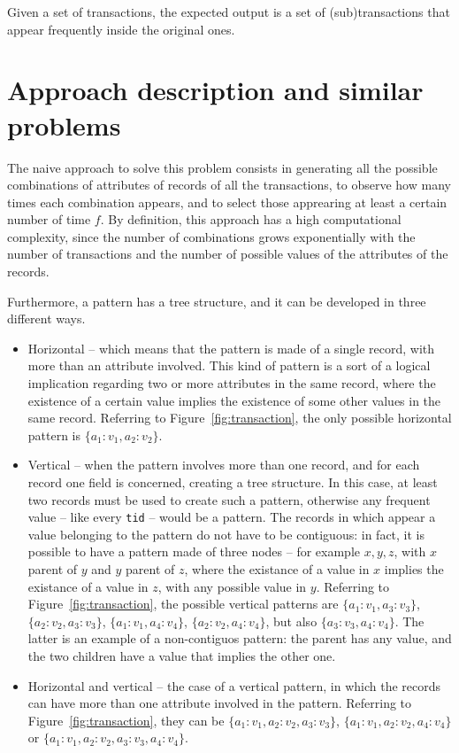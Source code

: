 \documentclass{acm_proc_article-sp-sigmod09}
\begin{document}
Given a set of transactions, the expected output is a set of (sub)transactions that appear frequently inside the original ones.

\section{Approach description and similar problems}
\label{sec:general}
The naive approach to solve this problem consists in generating all the possible combinations of attributes of records of all the transactions, to observe how many times each combination appears, and to select those apprearing at least a certain number of time $f$. By definition, this approach has a high computational complexity, since the number of combinations grows exponentially with the number of transactions and the number of possible values of the attributes of the records.

Furthermore, a pattern has a tree structure, and it can be developed in three different ways.
\begin{itemize}
\item Horizontal -- which means that the pattern is made of a single record, with more than an attribute involved. This kind of pattern is a sort of a logical implication regarding two or more attributes in the same record, where the existence of a certain value implies the existence of some other values in the same record. Referring to Figure~\ref{fig:transaction}, the only possible horizontal pattern is $\{a_1 \colon v_1, a_2 \colon v_2\}$.
\item Vertical -- when the pattern involves more than one record, and for each record one field is concerned, creating a tree structure. In this case, at least two records must be used to create such a pattern, otherwise any frequent value -- like every \texttt{tid} -- would be a pattern. The records in which appear a value belonging to the pattern do not have to be contiguous: in fact, it is possible to have a pattern made of three nodes -- for example $x, y, z$, with $x$ parent of $y$ and $y$ parent of $z$, where the existance of a value in $x$ implies the existance of a value in $z$, with any possible value in $y$. Referring to Figure~\ref{fig:transaction}, the possible vertical patterns are $\{a_1 \colon v_1, a_3 \colon v_3\}$, $\{a_2 \colon v_2, a_3 \colon v_3\}$, $\{a_1 \colon v_1, a_4 \colon v_4\}$, $\{a_2 \colon v_2, a_4 \colon v_4\}$, but also $\{a_3 \colon v_3, a_4 \colon v_4\}$. The latter is an example of a non-contiguos pattern: the parent has any value, and the two children have a value that implies the other one.
\item Horizontal and vertical -- the case of a vertical pattern, in which the records can have more than one attribute involved in the pattern. Referring to Figure~\ref{fig:transaction}, they can be $\{a_1 \colon v_1, a_2 \colon v_2, a_3 \colon v_3\}$, $\{a_1 \colon v_1, a_2 \colon v_2, a_4 \colon v_4\}$ or $\{a_1 \colon v_1, a_2 \colon v_2, a_3 \colon v_3, a_4 \colon v_4\}$.
\end{itemize}
\end{document}

